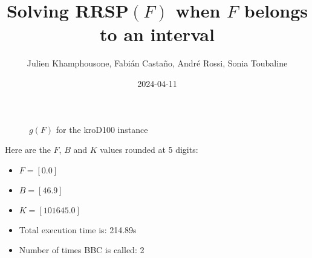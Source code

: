 \documentclass{article}
\begin{document}
     \title{Solving RRSP$(F)$ when $F$ belongs to an interval}
     \author{Julien Khamphousone, Fabi\'an Casta\~no, Andr\'e Rossi, Sonia Toubaline}
     \date{2024-04-11}
     \maketitle
     \def\F{{0.0,0.0}}
\def\gF{{1016.45,101645.0}}
\begin{figure}[ht!]
    \begin{center}
    \end{center}
    \vspace*{-2eM}
    \caption{$g(F)$ for the kroD100 instance}\label{fig:1}
    \end{figure}
    Here are the $F$, $B$ and $K$ values rounded at 5 digits:

\begin{itemize}
	\item  $F = [0.0]$
 \item $B = [46.9]$
 \item  $K = [101645.0]$\item Total execution time is: 214.89s\item Number of times BBC is called: 2\end{itemize}
\end{document}
